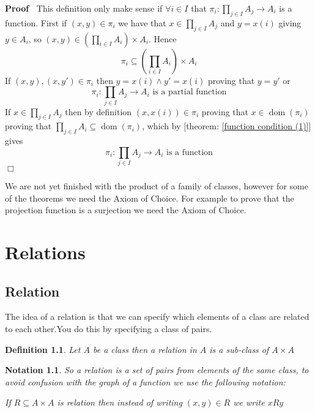 \documentclass{book}
\newcommand{\tmop}[1]{\ensuremath{\operatorname{#1}}}
\newenvironment{proof}{\noindent\textbf{Proof\ }}{\hspace*{\fill}$\Box$\medskip}
\newtheorem{definition}{Definition}
{\theorembodyfont{\rmfamily}\newtheorem{example}{Example}}
\newtheorem{notation}{Notation}
{\theorembodyfont{\rmfamily}\newtheorem{note}{Note}}
\begin{document}
\begin{proof}
  This definition only make sense if $\forall i \in I$ that $\pi_i : \prod_{j
  \in I} A_j \rightarrow A_i$ is a function. First if $(x, y) \in \pi_i$ we
  have that $x \in \prod_{j \in I} A_j$ and $y = x (i)$ giving $y \in A_i$, so
  $(x, y) \in \left( \prod_{i \in I} A_i \right) \times A_i$. Hence
  \begin{equation}
    \label{eq 2.51.007} \pi_i \subseteq \left( \prod_{i \in I} A_i \right)
    \times A_i
  \end{equation}
  If $(x, y), (x, y') \in \pi_i$ then $y = x (i) \wedge y' = x (i) $ proving
  that $y = y'$ or
  \[ \pi_i : \prod_{j \in I} A_j \rightarrow A_i \text{ is a partial function}
  \]
  If $x \in \prod_{j \in I} A_j$ then by definition $(x, x (i)) \in \pi_i$
  proving that $x \in \tmop{dom} (\pi_i)$ proving that $\prod_{j \in I} A_i
  \subseteq \tmop{dom} (\pi_i)$, which by [theorem: \ref{function condition
  (1)}] gives
  \[ \pi_i : \prod_{j \in I} A_j \rightarrow A_i \text{ is a function} \]
\end{proof}

We are not yet finished with the product of a family of classes, however for
some of the theorems we need the Axiom of Choice. For example to prove that
the projection function is a surjection we need the Axiom of Choice.

\chapter{Relations}

\section{Relation}

The idea of a relation is that we can specify which elements of a class are
related to each other.\.{}You do this by specifying a class of pairs.

\begin{definition}
  \label{relation}{}Let $A$ be a class then a relation in $A$
  is a sub-class of $A \times A$
\end{definition}

\begin{notation}
  So a relation is a set of pairs from elements of the same class, to avoid
  confusion with the graph of a function we use the following notation:
  
  If $R \subseteq A \times A$ is relation then instead of writing $(x, y) \in
  R$ we write $x R y$
\end{notation}
\end{document}
